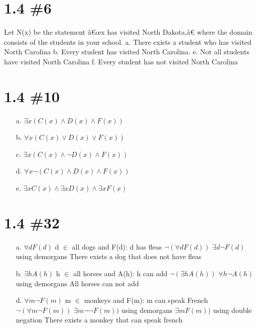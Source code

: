 \documentclass[h]{article}
\begin{document}
\section*{1.4 \#6}
Let N(x) be the statement â€œx has visited North Dakota,â€ where the domain consists of the students in your school.\newline
a. There exists a student who has visited North Carolina\newline
b. Every student has visited North Carolina.\newline
e. Not all students have visited North Carolina\newline
f. Every student has not visited North Carolina\newline

\section*{1.4 \#10}
\begin{enumerate}
\item[a.] $\exists x(C(x) \wedge D(x) \wedge F(x))$
\item[b.] $\forall x(C(x) \vee D(x) \vee F(x))$
\item[c.] $\exists x(C(x) \wedge \neg D(x) \wedge F(x))$
\item[d.] $\forall x \neg (C(x) \wedge D(x) \wedge F(x))$
\item[e.] $\exists xC(x) \wedge \exists xD(x) \wedge \exists xF(x)$
\end{enumerate}

\section*{1.4 \#32}
\begin{enumerate}
\item[a.] $\forall d F(d)$ d $\in $ all dogs and F(d): d has fleas\newline
$\neg (\forall d F(d))$\newline
$\exists d \neg F(d)$ using demorgans\newline
There exists a dog that does not have fleas
\item[b.] $\exists h A(h)$ h $\in$ all horses and A(h): h can add\newline
$\neg (\exists h A(h))$\newline
$\forall h \neg A(h)$ using demorgans\newline
All horses can not add
\item[d.] $\forall m \neg F(m)$ m $\in$ monkeys and F(m): m can speak French  \newline
$\neg (\forall m \neg F(m))$\newline
$\exists m \neg \neg F(m))$ using demorgans\newline
$\exists m F(m))$ using double negation\newline
There exists a monkey that can speak french
\end{enumerate}
\end{document}
